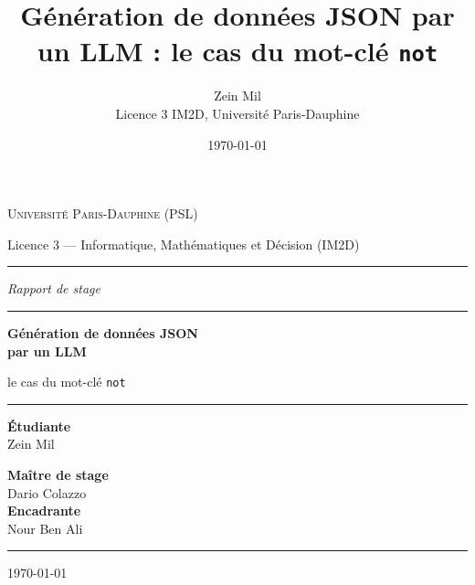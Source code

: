 \documentclass[11pt,a4paper]{article}
\title{Génération de données JSON par un LLM : le cas du mot-clé \texttt{not}}
\author{Zein Mil \\ Licence 3 IM2D, Université Paris-Dauphine}
\date{\today}
\begin{document}
\begin{titlepage}
\centering
\vspace*{1cm}

{\large\scshape Université Paris-Dauphine (PSL)\par}
\vspace{0.15cm}
{\normalsize Licence 3 --- Informatique, Mathématiques et Décision (IM2D)\par}

\vspace{0.4cm}
\rule{0.6\textwidth}{0.4pt}
\vspace{2.5cm}

{\Large\itshape Rapport de stage\par}
\vspace{1cm}

\rule{\textwidth}{1pt}
\vspace{0.5cm}
{\huge\bfseries Génération de données JSON\\[0.3cm] par un LLM\par}
\vspace{0.5cm}
{\Large le cas du mot-clé \texttt{not}\par}
\vspace{0.5cm}
\rule{\textwidth}{1pt}

\vspace{3cm}

\begin{minipage}{0.45\textwidth}
\begin{flushleft} \large
\textbf{Étudiante}\\
Zein Mil
\end{flushleft}
\end{minipage}
\begin{minipage}{0.45\textwidth}
\begin{flushright} \large
\textbf{Maître de stage}\\
Dario Colazzo\\[0.5cm]
\textbf{Encadrante}\\
Nour Ben Ali
\end{flushright}
\end{minipage}

\vspace{2cm}
\rule{0.3\textwidth}{0.4pt}

\vfill

{\large \today\par}

\end{titlepage}

\tableofcontents
\newpage
\end{document}
